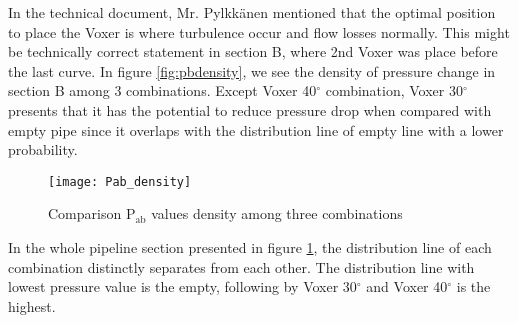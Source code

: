 In the technical document, Mr. Pylkkänen mentioned that the optimal position to place the Voxer is where turbulence occur and flow losses normally. This might be technically correct statement in section B, where 2nd Voxer was place before the last curve. In figure \ref{fig:pbdensity}, we see the density of pressure change in section B among 3 combinations. Except Voxer 40$^{\circ}$ combination, Voxer 30$^{\circ}$ presents that it has the potential to reduce pressure drop when compared with empty pipe since it overlaps with the distribution line of empty line with a lower probability.  
\newpage

\begin{figure}[t]
  \centering
  \texttt{[image: Pab\_density]}
  \caption{ Comparison P$_{\text{ab}}$ values density among three combinations}
  \label{fig:pabdensity}
\end{figure}

In the whole pipeline section presented in figure \ref{fig:pabdensity}, the distribution line of each combination distinctly separates from each other. The distribution line with lowest pressure value is the empty, following by Voxer 30$^{\circ}$ and Voxer 40$^{\circ}$  is the highest.
\clearpage %
